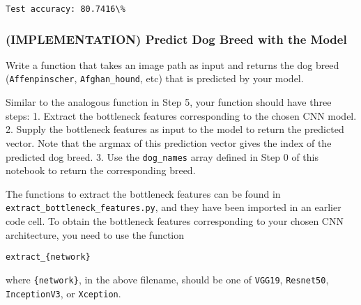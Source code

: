 \documentclass[11pt]{article}
\begin{document}
    \begin{Verbatim}[commandchars=\\\{\}]
Test accuracy: 80.7416\%

    \end{Verbatim}

    \subsubsection{(IMPLEMENTATION) Predict Dog Breed with the
Model}\label{implementation-predict-dog-breed-with-the-model}

Write a function that takes an image path as input and returns the dog
breed (\texttt{Affenpinscher}, \texttt{Afghan\_hound}, etc) that is
predicted by your model.

Similar to the analogous function in Step 5, your function should have
three steps: 1. Extract the bottleneck features corresponding to the
chosen CNN model. 2. Supply the bottleneck features as input to the
model to return the predicted vector. Note that the argmax of this
prediction vector gives the index of the predicted dog breed. 3. Use the
\texttt{dog\_names} array defined in Step 0 of this notebook to return
the corresponding breed.

The functions to extract the bottleneck features can be found in
\texttt{extract\_bottleneck\_features.py}, and they have been imported
in an earlier code cell. To obtain the bottleneck features corresponding
to your chosen CNN architecture, you need to use the function

\begin{verbatim}
extract_{network}
\end{verbatim}

where \texttt{\{network\}}, in the above filename, should be one of
\texttt{VGG19}, \texttt{Resnet50}, \texttt{InceptionV3}, or
\texttt{Xception}.
\end{document}
